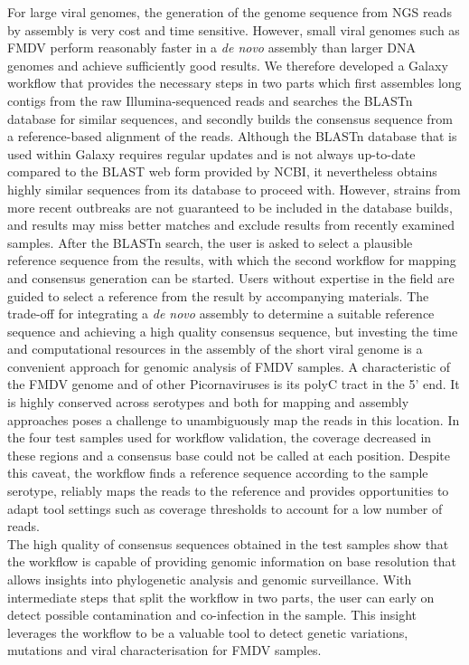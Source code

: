For large viral genomes, the generation of the genome sequence from \ac{NGS} reads by assembly is very cost and time sensitive. However, small viral genomes such as \ac{FMDV} perform reasonably faster in a \textit{de novo} assembly than larger \ac{DNA} genomes and achieve sufficiently good results. We therefore developed a Galaxy workflow that provides the necessary steps in two parts which first assembles long contigs from the raw Illumina-sequenced reads and searches the \ac{BLAST}n database for similar sequences, and secondly builds the consensus sequence from a reference-based alignment of the reads. Although the \ac{BLAST}n database that is used within Galaxy requires regular updates and is not always up-to-date compared to the \ac{BLAST} web form provided by \ac{NCBI}, it nevertheless obtains highly similar sequences from its database to proceed with. However, strains from more recent outbreaks are not guaranteed to be included in the database builds, and results may miss better matches and exclude results from recently examined samples. After the \ac{BLAST}n search, the user is asked to select a plausible reference sequence from the results, with which the second workflow for mapping and consensus generation can be started. Users without expertise in the field are guided to select a reference from the result by accompanying materials. The trade-off for integrating a \textit{de novo} assembly to determine a suitable reference sequence and achieving a high quality consensus sequence, but investing the time and computational resources in the assembly of the short viral genome is a convenient approach for genomic analysis of \ac{FMDV} samples. A characteristic of the \ac{FMDV} genome and of other Picornaviruses is its polyC tract in the 5' end. It is highly conserved across serotypes and both for mapping and assembly approaches poses a challenge to unambiguously map the reads in this location. In the four test samples used for workflow validation, the coverage decreased in these regions and a consensus base could not be called at each position. Despite this caveat, the workflow finds a reference sequence according to the sample serotype, reliably maps the reads to the reference and provides opportunities to adapt tool settings such as coverage thresholds to account for a low number of reads.\\
The high quality of consensus sequences obtained in the test samples show that the workflow is capable of providing genomic information on base resolution that allows insights into phylogenetic analysis and genomic surveillance. With intermediate steps that split the workflow in two parts, the user can early on detect possible contamination and co-infection in the sample. This insight leverages the workflow to be a valuable tool to detect genetic variations, mutations and viral characterisation for \ac{FMDV} samples.

